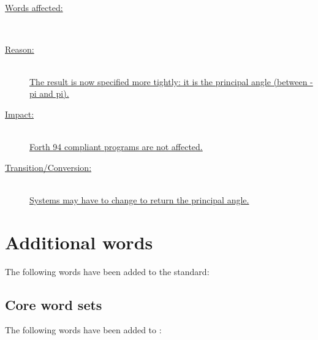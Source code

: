 \subsection[FATAN2]{\uline{}} %
\label{diff:12:fatan2}

\begin{description}
\item[\uline{Words affected:}] ~\\
	\uline{}

\item[\uline{Reason:}] ~\\
	\uline{The result is now specified more tightly: it is the principal angle
	(between -pi and pi).}

\item[\uline{Impact:}] ~\\
	\uline{Forth 94 compliant programs are not affected.}

\item[\uline{Transition/Conversion:}] ~\\
	\uline{Systems may have to change  to return
	the principal angle.}
\end{description}
\cbend


\section{Additional words} %
\label{diff:new12}

The following words have been added to the standard:

\setcounter{subsection}{5}
\subsection{Core word sets}
The following words have been added to :

\begin{minipage}[t]{0.3\linewidth}
	 \\
	 \\
\end{minipage}
\hfill
\begin{minipage}[t]{0.3\linewidth}
	 \\
	 \\
\end{minipage}
\hfill
\begin{minipage}[t]{0.3\linewidth}
	 \\
	 \\
\end{minipage}



